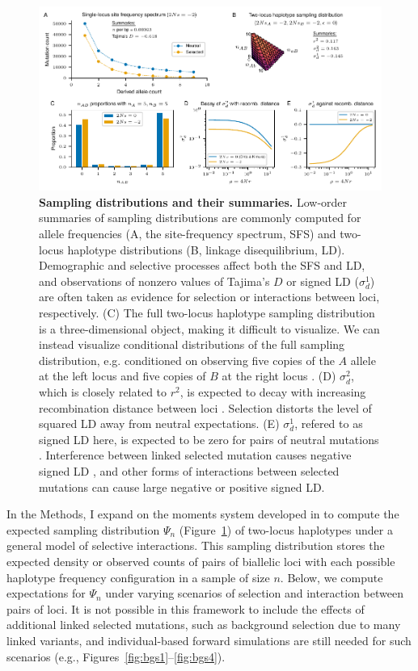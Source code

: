 \documentclass[]{article}
\begin{document}
\begin{figure}[tb!]
    \centering
    \includegraphics{../figures/two-locus-spectrum/stats_summaries}
    \caption{
        \textbf{Sampling distributions and their summaries.}
        Low-order summaries of sampling distributions are commonly computed
        for allele frequencies (A, the site-frequency spectrum, SFS)
        and two-locus haplotype distributions (B, linkage disequilibrium, LD).
        Demographic and selective processes affect both the SFS and LD,
        and observations of nonzero values of Tajima's $D$ or signed LD
        ($\sigma_d^1$) are often taken as evidence for selection or interactions
        between loci, respectively.
        (C) The full two-locus haplotype sampling distribution is a three-dimensional
        object, making it difficult to visualize. We can instead visualize conditional
        distributions of the full sampling distribution, e.g. conditioned on observing
        five copies of the $A$ allele at the left locus and five copies of $B$ at the
        right locus \citep[e.g.][]{Hudson2001-sg}.
        (D) $\sigma_d^2$, which is closely related to $r^2$, is expected to decay
        with increasing recombination distance between loci \citep{Ohta1969-ie}.
        Selection distorts the level of squared LD away from neutral expectations.
        (E) $\sigma_d^1$, refered to as signed LD here, is expected to be zero for
        pairs of neutral mutations \citep{Hill1968-vu}. Interference between linked
        selected mutation causes negative signed LD \citep{Hill1966-gv}, and other
        forms of interactions between selected mutations can cause large negative
        or positive signed LD.
    }
    \label{fig:TwoLocusFS}
\end{figure}

In the Methods, I expand on the moments system developed in
\citet{Ragsdale2019-nt} to compute the expected sampling distribution
\(\Psi_n\) (Figure~\ref{fig:TwoLocusFS}) of two-locus haplotypes under a
general model of selective interactions. This sampling distribution stores the
expected density or observed counts of pairs of biallelic loci with each
possible haplotype frequency configuration in a sample of size \(n\). Below, we
compute expectations for \(\Psi_n\) under varying scenarios of selection and
interaction between pairs of loci. It is not possible in this framework to
include the effects of additional linked selected mutations, such as background
selection due to many linked variants, and individual-based forward simulations
are still needed for such scenarios (e.g.,
Figures~\ref{fig:bgs1}--\ref{fig:bgs4}).
\end{document}
